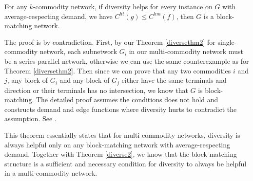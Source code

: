 \begin{theorem}
For any $k$-commodity network, if diversity helps for every instance on $G$ with average-respecting demand, we have $C^{ht}(g)\le C^{hm}(f)$, then $G$ is a block-matching network.
\end{theorem}

\begin{proof-sketch}
The proof is by contradiction. First, by our Theorem \ref{diversethm2} for single-commodity network, each subnetwork $G_i$ in our multi-commodity network must be a series-parallel network, otherwise we can use the same counterexample as for Theorem \ref{diversethm2}. Then since we can prove that any two commodities $i$ and $j$, any block of $G_i$ and any block of $G_j$ either have the same terminals and direction or their terminals has no intersection, we know that $G$ is block-matching. The detailed proof assumes the conditions does not hold and constructs demand and edge functions where diversity hurts to contradict the assumption. See \cite{ijcai2018-24}.
\end{proof-sketch}

This theorem essentially states that for multi-commodity networks, diversity is always helpful only on any block-matching network with average-respecting demand. Together with Theorem \ref{diverse2}, we know that the block-matching structure is a sufficient and necessary condition for diversity to always be helpful in a multi-commodity network.
